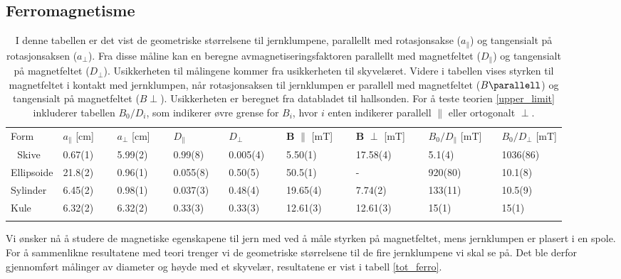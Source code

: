 \documentclass[%
 reprint,
 amsmath,amssymb,
 aps,
 norsk,
]{revtex4-1}
\begin{document}
\subsection{Ferromagnetisme}
\begin{table}\renewcommand{\arraystretch}{1.2}
\centering
\caption{I denne tabellen er det vist de geometriske størrelsene til jernklumpene, parallellt med rotasjonsakse ($a_{\parallel}$) og tangensialt på rotasjonsaksen ($a_{\perp}$). Fra disse måline kan en beregne avmagnetiseringsfaktoren parallellt med magnetfeltet ($D_{\parallel}$) og tangensialt på magnetfeltet ($D_{\perp}$). Usikkerheten til målingene kommer fra usikkerheten til skyvelæret. Videre i tabellen vises styrken til magnetfeltet i kontakt med jernklumpen, når rotasjonsaksen til jernklumpen er parallell med magnetfeltet ($B\parallell$) og tangensialt på magnetfeltet ($B\perp$). Usikkerheten er beregnet fra databladet til hallsonden. For å teste teorien \eqref{upper_limit} inkluderer tabellen $B_0/D_i$, som indikerer øvre grense for $B_i$, hvor $i$ enten indikerer parallell $\parallel$ eller ortogonalt $\perp$.}
\label{tot_ferro}
\begin{tabular}{@{}lllllllll@{}}
\botrule
Form & $a_{\parallel}$ {[}cm{]} $\quad$  & $a_{\perp}$ {[}cm{]} $\quad$  & $D_{\parallel}$ $\qquad \quad$ & $D_{\perp}$ $\qquad\quad$ &  $\bm{B}$  $\parallel$ {[}mT{]} $\quad$ & $\bm{B}$ $\perp$ {[}mT{]} $\quad$ & $B_0/D_{\parallel}$ [mT]$\quad$  & $B_0/D_{\perp}$ [mT]\\ \colrule 
Skive      & 0.67(1)        & 5.99(2)           & 0.99(8)         & 0.005(4) & 5.50(1)                           & 17.58(4)         &    5.1(4)  &  1036(86)      \\
Ellipsoide & 21.8(2)        & 0.96(1)           & 0.055(8)        & 0.50(5) & 50.5(1)                           & -                &   920(80)    & 10.1(8)       \\
Sylinder   & 6.45(2)        & 0.98(1)           & 0.037(3)        & 0.48(4) & 19.65(4)                          & 7.74(2)          &   133(11)    &10.5(9)           \\
Kule       & 6.32(2)        & 6.32(2)           & 0.33(3)         & 0.33(3) & 12.61(3)            & 12.61(3)                &   15(1)  & 15(1)        \\ \botrule
\end{tabular}
\end{table}
Vi ønsker nå å studere de magnetiske egenskapene til jern med ved å måle styrken på magnetfeltet, mens jernklumpen er plasert i en spole. For å sammenlikne resultatene med teori trenger vi de geometriske størrelsene til de fire jernklumpene vi skal se på. Det ble derfor gjennomført målinger av diameter og høyde med et skyvelær, resultatene er vist  i tabell \vref{tot_ferro}.
\end{document}
